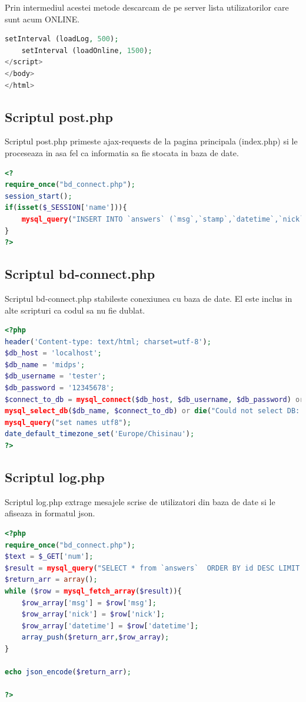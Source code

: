 \documentclass[12pt]{article}
\begin{document}
Prin intermediul acestei metode descarcam de pe server lista utilizatorilor care sunt acum ONLINE.
\begin{lstlisting}[language=php, caption={Fisierul index.php. setarea intervalului actualizarii log-ului de mesaje si listei de utilizatori}, label=list2]
	setInterval (loadLog, 500);
    setInterval (loadOnline, 1500);
</script>
</body>
</html>	
\end{lstlisting}

\subsection{Scriptul post.php}
Scriptul post.php primeste ajax-requests de la pagina principala (index.php) si le proceseaza in asa fel ca informatia sa fie stocata in baza de date.
\newpage
\begin{lstlisting}[language=php, caption={Fisierul post.php}, label=list2]
<?
require_once("bd_connect.php");
session_start();
if(isset($_SESSION['name'])){
    mysql_query("INSERT INTO `answers` (`msg`,`stamp`,`datetime`,`nick`) VALUES ('".$_POST['text']."','".time()."','".date("g:i A")."','".$_SESSION['name']."')") or die(mysql_error());
}
?>
\end{lstlisting}
\subsection{Scriptul bd-connect.php}
Scriptul bd-connect.php stabileste conexiunea cu baza de date. El este inclus in alte scripturi ca codul sa nu fie dublat.
\begin{lstlisting}[language=php, caption={Fisierul bd-connect.php}, label=list2]
<?php
header('Content-type: text/html; charset=utf-8');
$db_host = 'localhost';
$db_name = 'midps';
$db_username = 'tester';
$db_password = '12345678';
$connect_to_db = mysql_connect($db_host, $db_username, $db_password) or die("Could not connect: " . mysql_error());
mysql_select_db($db_name, $connect_to_db) or die("Could not select DB: " . mysql_error());
mysql_query("set names utf8");
date_default_timezone_set('Europe/Chisinau');
?>
\end{lstlisting}
\subsection{Scriptul log.php}
Scriptul log.php extrage mesajele scrise de utilizatori din baza de date si le afiseaza in formatul json.
\newpage
\begin{lstlisting}[language=php, caption={Fisierul log.php}, label=list2]
<?php
require_once("bd_connect.php");
$text = $_GET['num'];
$result = mysql_query("SELECT * from `answers`  ORDER BY id DESC LIMIT ".$_GET['num']."") or die(mysql_error());
$return_arr = array();
while ($row = mysql_fetch_array($result)){
	$row_array['msg'] = $row['msg'];
	$row_array['nick'] = $row['nick'];
	$row_array['datetime'] = $row['datetime'];
	array_push($return_arr,$row_array);
}

echo json_encode($return_arr);

?>
\end{lstlisting}
\end{document}
